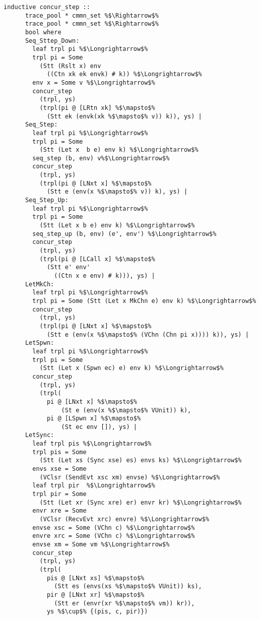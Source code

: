 \documentclass{article}
\begin{document}
\begin{lstlisting}[style=codestyle1, escapechar=\%]
    inductive concur_step ::
      trace_pool * cmmn_set %$\Rightarrow$%
      trace_pool * cmmn_set %$\Rightarrow$%
      bool where 
      Seq_Sttep_Down:
        leaf trpl pi %$\Longrightarrow$%
        trpl pi = Some
          (Stt (Rslt x) env
            ((Ctn xk ek envk) # k)) %$\Longrightarrow$%
        env x = Some v %$\Longrightarrow$%
        concur_step
          (trpl, ys)
          (trpl(pi @ [LRtn xk] %$\mapsto$%
            (Stt ek (envk(xk %$\mapsto$% v)) k)), ys) |
      Seq_Step:
        leaf trpl pi %$\Longrightarrow$%
        trpl pi = Some
          (Stt (Let x  b e) env k) %$\Longrightarrow$%
        seq_step (b, env) v%$\Longrightarrow$%
        concur_step
          (trpl, ys)
          (trpl(pi @ [LNxt x] %$\mapsto$%
            (Stt e (env(x %$\mapsto$% v)) k), ys) |
      Seq_Step_Up: 
        leaf trpl pi %$\Longrightarrow$%
        trpl pi = Some
          (Stt (Let x b e) env k) %$\Longrightarrow$%
        seq_step_up (b, env) (e', env') %$\Longrightarrow$%
        concur_step
          (trpl, ys)
          (trpl(pi @ [LCall x] %$\mapsto$%
            (Stt e' env'
              ((Ctn x e env) # k))), ys) |
      LetMkCh: 
        leaf trpl pi %$\Longrightarrow$%
        trpl pi = Some (Stt (Let x MkChn e) env k) %$\Longrightarrow$%
        concur_step
          (trpl, ys)
          (trpl(pi @ [LNxt x] %$\mapsto$%
            (Stt e (env(x %$\mapsto$% (VChn (Chn pi x)))) k)), ys) |
      LetSpwn:
        leaf trpl pi %$\Longrightarrow$%
        trpl pi = Some
          (Stt (Let x (Spwn ec) e) env k) %$\Longrightarrow$%
        concur_step
          (trpl, ys)
          (trpl(
            pi @ [LNxt x] %$\mapsto$%
                (St e (env(x %$\mapsto$% VUnit)) k), 
            pi @ [LSpwn x] %$\mapsto$%
                (St ec env []), ys) |
      LetSync:
        leaf trpl pis %$\Longrightarrow$%
        trpl pis = Some
          (Stt (Let xs (Sync xse) es) envs ks) %$\Longrightarrow$%
        envs xse = Some
          (VClsr (SendEvt xsc xm) envse) %$\Longrightarrow$%
        leaf trpl pir  %$\Longrightarrow$%
        trpl pir = Some
          (Stt (Let xr (Sync xre) er) envr kr) %$\Longrightarrow$%
        envr xre = Some
          (VClsr (RecvEvt xrc) envre) %$\Longrightarrow$%
        envse xsc = Some (VChn c) %$\Longrightarrow$%
        envre xrc = Some (VChn c) %$\Longrightarrow$%
        envse xm = Some vm %$\Longrightarrow$%
        concur_step
          (trpl, ys)
          (trpl(
            pis @ [LNxt xs] %$\mapsto$%
              (Stt es (envs(xs %$\mapsto$% VUnit)) ks), 
            pir @ [LNxt xr] %$\mapsto$%
              (Stt er (envr(xr %$\mapsto$% vm)) kr)), 
            ys %$\cup$% {(pis, c, pir)})

    \end{lstlisting}
\end{document}
